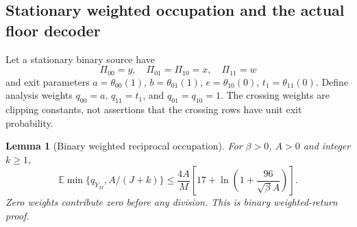 \documentclass[11pt,letterpaper]{article}
\newtheorem{lemma}[theorem]{Lemma}
\theoremstyle{definition}\newtheorem{definition}[theorem]{Definition}
\theoremstyle{remark}\newtheorem{remark}[theorem]{Remark}
\newcommand{\E}{\mathbb{E}}
\begin{document}
\subsection{Stationary weighted occupation and the actual floor decoder}
Let a stationary binary source have
\[
 \Pi_{00}=y,\quad \Pi_{01}=\Pi_{10}=x,\quad \Pi_{11}=w
\]
and exit parameters
$a=\theta_{00}(1)$, $b=\theta_{01}(1)$,
$e=\theta_{10}(0)$, $t_1=\theta_{11}(0)$.
Define analysis weights
$q_{00}=a$, $q_{11}=t_1$, and $q_{01}=q_{10}=1$.
The crossing weights are clipping constants, not assertions that the crossing rows have unit exit probability.
\begin{lemma}[Binary weighted reciprocal occupation]\label{lem:binaryreturn}
For $\beta>0$, $A>0$ and integer $k\ge1$,
\begin{equation}\label{eq:binaryreturn}
 \E\min\{q_{Y_M},A/(J+k)\}
 \le\frac{4A}{M}\left[17+\ln\left(1+\frac{96}{\sqrt\beta A}\right)\right].
\end{equation}
Zero weights contribute zero before any division. This is binary weighted-return proof.
\end{lemma}
\end{document}
